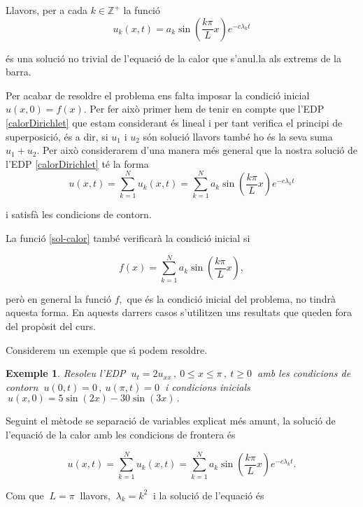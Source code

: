 \documentclass[12pt]{article}
\newtheorem{exemple}{Exemple}[subsection]
\newcommand{\Z}{\mathbb{Z}}
\begin{document}
Llavors, per a cada $k\in \Z^+$ la funci{\'o}
\[
 u_k(x,t)=a_k\sin\left(\frac{k\pi}{L} x\right)e^{-c\lambda_k t}
\]

{\'e}s una soluci{\'o} no trivial de l'equaci{\'o} de la calor que s'anul.la als extrems de la barra.

Per acabar de resoldre el problema ens falta imposar la condici{\'o} inicial $u(x,0)=f(x).$ Per fer aix{\`o}
primer hem de tenir en compte que l'EDP \eqref{calorDirichlet} que estam considerant {\'e}s lineal i per tant verifica
el principi de superposici{\'o}, {\'e}s a dir, si $u_1$ i $u_2$ s{\'o}n soluci{\'o} llavors tamb{\'e} ho {\'e}s la seva suma
$u_1+u_2.$  Per aix{\`o} considerarem d'una manera m{\'e}s general que la nostra soluci{\'o} de l'EDP \eqref{calorDirichlet}
t{\'e} la forma
\begin{equation}\label{sol-calor}
 u(x,t)=\sum_{k=1}^N u_k(x,t)=\sum_{k=1}^N a_k\sin\left(\frac{k\pi}{L} x\right)e^{-c\lambda_k t}
\end{equation}

i satisf{\`a} les condicions de contorn.

La funci{\'o} \eqref{sol-calor} tamb{\'e} verificar{\`a} la condici{\'o} inicial si

\[
 f(x)=\sum_{k=1}^N a_k\sin\left(\frac{k\pi}{L} x\right),
\]

per{\`o} en general la funci{\'o} $f,$ que {\'e}s la condici{\'o} inicial del problema, no tindr{\`a} aquesta forma. En aquests darrers casos s'utilitzen uns resultats que queden fora del prop{\`o}sit del curs.

\vspace{0.8cm}
Considerem un exemple que s{\'\i} podem resoldre.

\vspace{0.4cm}
\begin{exemple}
 Resoleu l'EDP $\ u_t=2u_{xx}\,,\ 0\leq x\leq \pi\,,\ t\geq 0\ $ amb les condicions de contorn $\ u(0,t)=0\,,\ u(\pi,t)=0\ $ i
condicions inicials $\ u(x,0)=5\sin(2x)-30\sin(3x)\,.$
\end{exemple}

Seguint el m{\`e}tode se separaci{\'o} de variables explicat m{\'e}s amunt, la soluci{\'o} de l'equaci{\'o} de la calor amb les condicions de frontera {\'e}s

\[
 u(x,t)=\sum_{k=1}^N u_k(x,t)=\sum_{k=1}^N a_k\sin\left(\frac{k\pi}{L} x\right)e^{-c\lambda_k t}.
\]

Com que $\ L=\pi\ $ llavors,  $\ \lambda_k=k^2\ $ i la soluci{\'o} de l'equaci{\'o} {\'e}s
\end{document}
